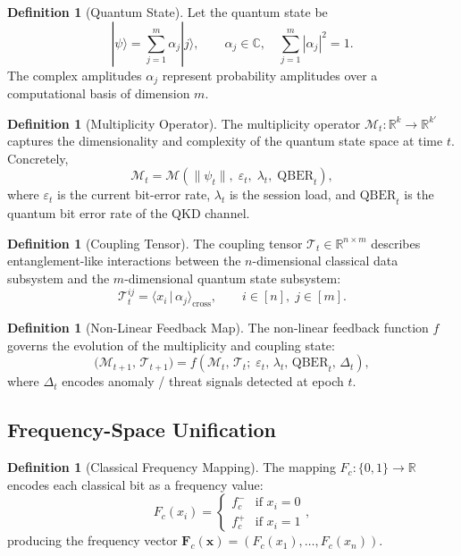 \documentclass[12pt,letterpaper]{article}
\theoremstyle{plain}
\theoremstyle{definition}
\newtheorem{definition}[theorem]{Definition}
\begin{document}
\begin{definition}[Quantum State]
Let the quantum state be
\[
  |\psi\rangle = \sum_{j=1}^{m} \alpha_j |j\rangle, \qquad
  \alpha_j \in \mathbb{C}, \quad
  \sum_{j=1}^{m} |\alpha_j|^2 = 1.  \tag{1}
\]
The complex amplitudes $\alpha_j$ represent probability amplitudes over a
computational basis of dimension $m$.
\end{definition}

\begin{definition}[Multiplicity Operator]
The multiplicity operator $\mathcal{M}_t : \mathbb{R}^k \to \mathbb{R}^{k'}$
captures the dimensionality and complexity of the quantum state space at time
$t$. Concretely,
\[
  \mathcal{M}_t = \mathcal{M}\!\left(\|\psi_t\|,\; \varepsilon_t,\;
    \lambda_t,\; \mathrm{QBER}_t\right),  \tag{2}
\]
where $\varepsilon_t$ is the current bit-error rate, $\lambda_t$ is the
session load, and $\mathrm{QBER}_t$ is the quantum bit error rate of the QKD
channel.
\end{definition}

\begin{definition}[Coupling Tensor]
The coupling tensor $\mathcal{T}_t \in \mathbb{R}^{n \times m}$ describes
entanglement-like interactions between the $n$-dimensional classical data
subsystem and the $m$-dimensional quantum state subsystem:
\[
  \mathcal{T}_t^{ij} = \langle x_i \,|\, \alpha_j \rangle_{\text{cross}},
  \qquad i \in [n],\; j \in [m].  \tag{3}
\]
\end{definition}

\begin{definition}[Non-Linear Feedback Map]
The non-linear feedback function $f$ governs the evolution of the multiplicity
and coupling state:
\[
  \bigl(\mathcal{M}_{t+1},\, \mathcal{T}_{t+1}\bigr)
  = f\!\left(\mathcal{M}_t,\, \mathcal{T}_t;\;
    \varepsilon_t,\, \lambda_t,\, \mathrm{QBER}_t,\, \Delta_t\right),  \tag{4}
\]
where $\Delta_t$ encodes anomaly / threat signals detected at epoch $t$.
\end{definition}

\subsection{Frequency-Space Unification}

\begin{definition}[Classical Frequency Mapping]
The mapping $F_c : \{0,1\} \to \mathbb{R}$ encodes each classical bit as a
frequency value:
\[
  F_c(x_i) = \begin{cases} f_c^- & \text{if } x_i = 0 \\ f_c^+ & \text{if }
  x_i = 1 \end{cases},  \tag{5}
\]
producing the frequency vector
$\mathbf{F}_c(\mathbf{x}) = (F_c(x_1), \ldots, F_c(x_n))$.
\end{definition}
\end{document}
